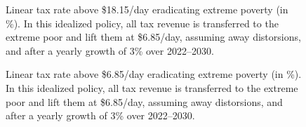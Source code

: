 \documentclass[12pt,english]{article}
\begin{document}
\begin{figure}[!htb]
  \caption[Anti-acute-poverty tax above \$18.15/day after 3\% growth (HFCE-scaled).]{Linear tax rate above \$18.15/day eradicating extreme poverty (in \%). In this idealized policy, all tax revenue is transferred to the extreme poor and lift them at \$6.85/day, assuming away distorsions, and after a yearly growth of 3\% over 2022--2030. 
  }\label{fig:antipoverty_7_tax_18_average}
\end{figure}

\begin{figure}[!htb]
  \caption[Anti-acute-poverty tax above \$6.85/day after 3\% growth (HFCE-scaled).]{Linear tax rate above \$6.85/day eradicating extreme poverty (in \%). In this idealized policy, all tax revenue is transferred to the extreme poor and lift them at \$6.85/day, assuming away distorsions, and after a yearly growth of 3\% over 2022--2030. 
  }\label{fig:antipoverty_7_tax_7_average}
\end{figure}
\end{document}
